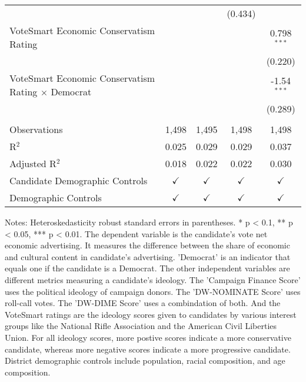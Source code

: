 \begin{table}[htbp]
\begin{tabular}{lcccc}
                                                                &                &                & (0.434)        &   \\   
      VoteSmart Economic Conservatism Rating                    &                &                &                & 0.798$^{***}$\\   
                                                                &                &                &                & (0.220)\\   
      VoteSmart Economic Conservatism Rating $\times$ Democrat  &                &                &                & -1.54$^{***}$\\   
                                                                &                &                &                & (0.289)\\   
       \\
      Observations                                              & 1,498          & 1,495          & 1,498          & 1,498\\  
      R$^2$                                                     & 0.025          & 0.029          & 0.029          & 0.037\\  
      Adjusted R$^2$                                            & 0.018          & 0.022          & 0.022          & 0.030\\  
      Candidate Demographic Controls                            & $\checkmark$   & $\checkmark$   & $\checkmark$   & $\checkmark$\\   
      Demographic Controls                                      & $\checkmark$   & $\checkmark$   & $\checkmark$   & $\checkmark$\\   
      \bottomrule
   \end{tabular}
   
   \par \raggedright 
   \footnotesize Notes: Heteroskedasticity robust standard errors in parentheses. * p < 0.1, ** p < 0.05, *** p < 0.01.  The dependent variable is the candidate's vote net economic advertising. It measures the difference between the share of economic and cultural content in candidate's advertising. 'Democrat' is an indicator that equals one if the candidate is a Democrat. The other independent variables are different metrics measuring a candidate's ideology. The 'Campaign Finance Score' uses the political ideology of campaign donors. The 'DW-NOMINATE Score' uses roll-call votes. The 'DW-DIME Score' uses a combindation of both. And the VoteSmart ratings are the ideology scores given to candidates by various interest groups like the National Rifle Association and the American Civil Liberties Union. For all ideology scores, more postive scores indicate a more conservative candidate, whereas more negative scores indicate a more progressive candidate. District demographic controls include population, racial composition, and age composition.
\end{table}


